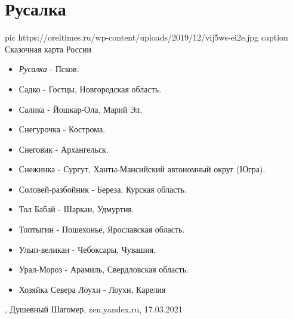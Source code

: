  
 
 
 
 
\chapter{Русалка}

\ifcmt
  pic https://oreltimes.ru/wp-content/uploads/2019/12/vij5ws-ei2e.jpg
	caption Сказочная карта России
\fi
\begin{itemize}
  \item \emph{Русалка} - Псков.
  \item Садко - Гостцы, Новгородская область.
  \item Салика - Йошкар-Ола, Марий Эл.
  \item Снегурочка - Кострома.
  \item Снеговик - Архангельск.
  \item Снежинка - Сургут, Ханты-Мансийский автономный округ (Югра).
  \item Соловей-разбойник - Береза, Курская область.
  \item Тол Бабай - Шаркан, Удмуртия.
  \item Топтыгин - Пошехонье, Ярославская область.
  \item Улып-великан - Чебоксары, Чувашия.
  \item Урал-Мороз - Арамиль, Свердловская область.
  \item Хозяйка Севера Лоухи - Лоухи, Карелия
\end{itemize}
, 
Душевный Шагомер, zen.yandex.ru, 17.03.2021

